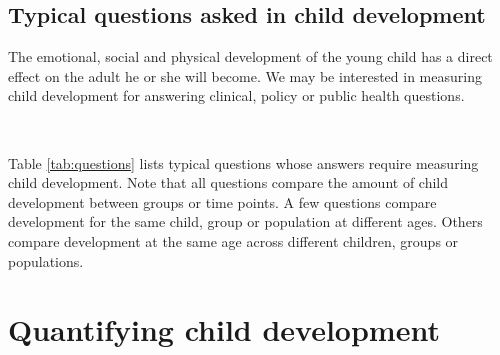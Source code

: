 \documentclass[
]{book}
\begin{document}
\hypertarget{sec:questions}{%
\section{Typical questions asked in child development}\label{sec:questions}}

The emotional, social and physical development of the young child has a direct effect on the adult he or she will become. We may be interested in measuring child development for answering clinical, policy or public health questions.

\begin{table}

\caption{\label{tab:questions}Questions whose answers require quantitative measurements of child development.}
\centering
{}
\end{table}

~

Table \ref{tab:questions} lists typical questions whose answers require measuring child development. Note that all questions compare the amount of child development between groups or time points. A few questions compare development for the same child, group or population at different ages. Others compare development at the same age across different children, groups or populations.

\hypertarget{ch:threeways}{%
\chapter{Quantifying child development}\label{ch:threeways}}
\end{document}
